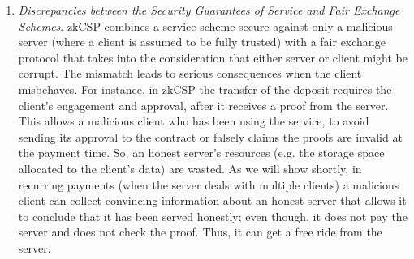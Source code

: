 \begin{enumerate}



\item\textit{Discrepancies between the Security Guarantees of Service and Fair Exchange Schemes}. zkCSP combines a service scheme secure against only a malicious server (where a client is assumed to be fully trusted) with a fair exchange protocol that takes into the consideration that either server or client might be corrupt.  The mismatch leads to serious consequences when the client misbehaves. For instance, in zkCSP the transfer of the deposit requires the client's engagement and approval, after it receives a proof from the server. This allows  a malicious client who has been using the service,  to avoid sending its approval to the contract or falsely claims the proofs are invalid at the payment time. So, an honest server's resources (e.g. the storage space allocated to the client's data) are wasted. As we will show shortly, in recurring payments (when the server deals with multiple clients) a malicious client can collect  convincing information about an honest server  that allows it to conclude that it has been  served honestly; even though, it does not pay the server and does not check the proof. Thus, it can  get a free ride from the server. 





\end{enumerate}
